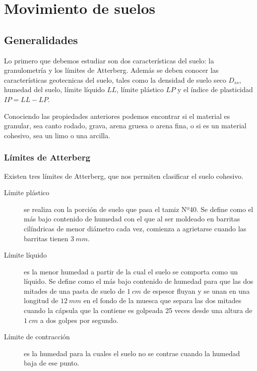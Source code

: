 \documentclass[../main.tex]{subfiles}
\begin{document}
\section{Movimiento de suelos}

\subsection{Generalidades}

Lo primero que debemos estudiar son dos características del suelo: la granulometría
y los límites de Atterberg. Además se deben conocer las características geotecnicas
del suelo, tales como la densidad de suelo seco $D_{ss}$, humedad del suelo, 
límite líquido $LL$, límite plástico $LP$ y el índice de plasticidad $IP = LL - LP$.

Conociendo las propiedades anteriores podemos encontrar si el material es granular,
sea canto rodado, grava, arena gruesa o arena fina, o si es un material cohesivo,
sea un limo o una arcilla.

\subsubsection{Límites de Atterberg}

Existen tres límites de Atterberg, que nos permiten clasificar el suelo cohesivo.

\begin{description}
  \item[Límite plástico]  se realiza con la porción de suelo que pasa el tamiz 
    Nº40. Se define como el más bajo contenido de humedad con el que al ser moldeado
    en barritas cilíndricas de menor diámetro cada vez, comienza a agrietarse cuando
    las barritas tienen $\SI{3}{mm}$.

  \item[Límite líquido]  es la menor humedad a partir de la cual el suelo se 
    comporta como un líquido. Se define como el más bajo contenido de humedad para
    que las dos mitades de una pasta de suelo de $\SI{1}{cm}$ de espesor fluyan
    y se unan en una longitud de $\SI{12}{mm}$ en el fondo de la muesca que separa
    las dos mitades cuando la cápsula que la contiene es golpeada 25 veces desde
    una altura de $\SI{1}{cm}$ a dos golpes por segundo.

  \item[Límite de contracción] es la humedad para la cuales el suelo no se contrae
    cuando la humedad baja de ese punto.
\end{description}
\end{document}
